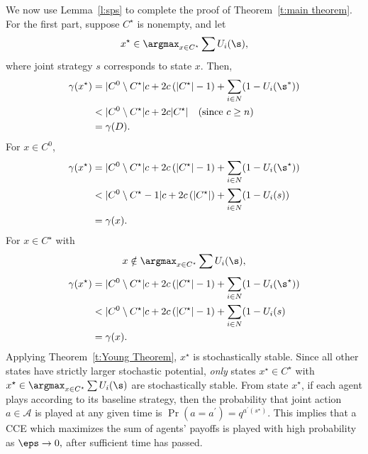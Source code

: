 

We now use Lemma~\ref{l:sps} to complete the proof of Theorem~\ref{t:main theorem}. For the first part, suppose $C^\star$ is nonempty, and let $$x^\star\in \argmax_{x\in C^\star} \sum{U_i(\s)},$$ where joint strategy $s$ corresponds to state $x$.  Then,
\begin{align*}
\gamma(x^\star)  	&=  |C^0\setminus C^\star|c + 2c\left(|C^\star|-1\right) + \sum_{i\in N}(1 - U_i(\s^*))\\
			&<  |C^0\setminus C^\star|c + 2c|C^\star|  \quad\text{(since $c\geq n$)} \\
			&= \gamma(D).
\end{align*}
For $x \in C^0$, 
\begin{align*}
\gamma(x^\star)  	&=  |C^0\setminus C^\star|c + 2c\left(|C^\star|-1\right) + \sum_{i\in N}(1 - U_i(\s^\star))\\
			&<   |C^0\setminus C^\star - 1|c + 2c\left(|C^\star|\right) + \sum_{i\in N}(1 - U_i(s)) \\
			&=\gamma(x).
\end{align*}
For $x\in C^\star$ with $$x\notin \argmax_{x\in C^\star} \sum{U_i(\s)},$$
\begin{align*}
\gamma(x^\star)  	&=  |C^0\setminus C^\star|c + 2c\left(|C^\star|-1\right) + \sum_{i\in N}(1 - U_i(\s^\star))\\
				&<  |C^0\setminus C^\star|c + 2c\left(|C^\star|-1\right) + \sum_{i\in N}(1 - U_i(s)\\
				&=\gamma(x).
\end{align*}
Applying Theorem~\ref{t:Young Theorem}, $x^\star$ is stochastically stable. Since all other states have strictly larger stochastic potential, \emph{only} states $x^\star\in C^\star$ with $x^\star\in \argmax_{x\in C^\star} \sum{U_i(\s)}$ are stochastically stable. From state $x^\star$, if each agent plays according to its baseline strategy, then the probability that joint action $a\in \mathcal{A}$ is played at any given time is $\Pr(a  = a^\prime) = q^{a^\prime(s^\star)}.$  This implies that a CCE which maximizes the sum of agents' payoffs is played with high probability as $\eps\to 0,$ after sufficient time has passed.

